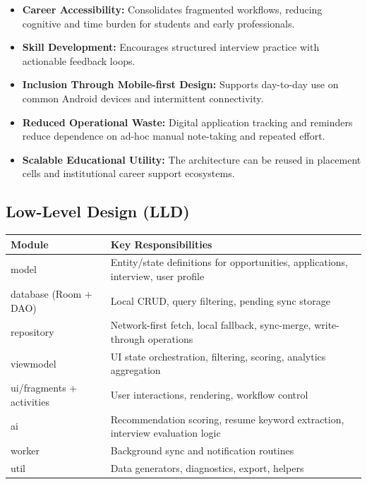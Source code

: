 \documentclass[conference]{IEEEtran}
\begin{document}
\begin{itemize}
  \item \textbf{Career Accessibility:} Consolidates fragmented workflows, reducing cognitive and time burden for students and early professionals.
  \item \textbf{Skill Development:} Encourages structured interview practice with actionable feedback loops.
  \item \textbf{Inclusion Through Mobile-first Design:} Supports day-to-day use on common Android devices and intermittent connectivity.
  \item \textbf{Reduced Operational Waste:} Digital application tracking and reminders reduce dependence on ad-hoc manual note-taking and repeated effort.
  \item \textbf{Scalable Educational Utility:} The architecture can be reused in placement cells and institutional career support ecosystems.
\end{itemize}

\subsection{Low-Level Design (LLD)}

\begin{table}[!tb]
\centering
\setlength{\tabcolsep}{4pt}
\normalsize
\begin{tabularx}{\textwidth}{|>{\RaggedRight\arraybackslash}X|>{\RaggedRight\arraybackslash}X|}
\hline
 \textbf{Module} & \textbf{Key Responsibilities} \\
\hline
 model & Entity/state definitions for opportunities, applications, interview, user profile \\
\hline
 database (Room + DAO) & Local CRUD, query filtering, pending sync storage \\
\hline
 repository & Network-first fetch, local fallback, sync-merge, write-through operations \\
\hline
 viewmodel & UI state orchestration, filtering, scoring, analytics aggregation \\
\hline
 ui/fragments + activities & User interactions, rendering, workflow control \\
\hline
 ai & Recommendation scoring, resume keyword extraction, interview evaluation logic \\
\hline
 worker & Background sync and notification routines \\
\hline
 util & Data generators, diagnostics, export, helpers \\
\hline
\end{tabularx}
\end{table}
\end{document}
